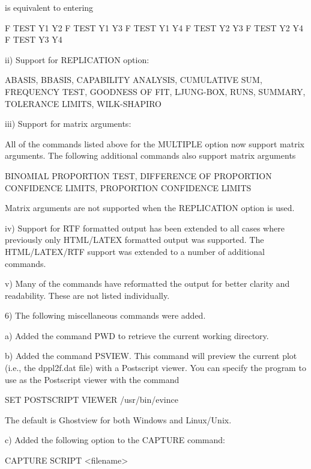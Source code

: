 {                is equivalent to entering

                    F TEST Y1 Y2
                    F TEST Y1 Y3
                    F TEST Y1 Y4
                    F TEST Y2 Y3
                    F TEST Y2 Y4
                    F TEST Y3 Y4

         ii) Support for REPLICATION option:

             ABASIS, BBASIS, CAPABILITY ANALYSIS, CUMULATIVE SUM,
             FREQUENCY TEST, GOODNESS OF FIT, LJUNG-BOX, RUNS, SUMMARY,
             TOLERANCE LIMITS, WILK-SHAPIRO

        iii) Support for matrix arguments:

             All of the commands listed above for the MULTIPLE option
             now support matrix arguments.  The following additional
             commands also support matrix arguments

             BINOMIAL PROPORTION TEST,
             DIFFERENCE OF PROPORTION CONFIDENCE LIMITS,
             PROPORTION CONFIDENCE LIMITS

             Matrix arguments are not supported when the REPLICATION
             option is used.

         iv) Support for RTF formatted output has been extended to
             all cases where previously only HTML/LATEX formatted
             output was supported.  The HTML/LATEX/RTF support was
             extended to a number of additional commands.

          v) Many of the commands have reformatted the output for better
             clarity and readability.  These are not listed individually.

 6) The following miscellaneous commands were added.

    a) Added the command PWD to retrieve the current working
       directory.

    b) Added the command PSVIEW.  This command will preview the
       current plot (i.e., the dppl2f.dat file) with a Postscript
       viewer.  You can specify the program to use as the Postscript
       viewer with the command

           SET POSTSCRIPT VIEWER  /usr/bin/evince

       The default is Ghostview for both Windows and Linux/Unix.

    c) Added the following option to the CAPTURE command:

           CAPTURE SCRIPT <filename>

}
